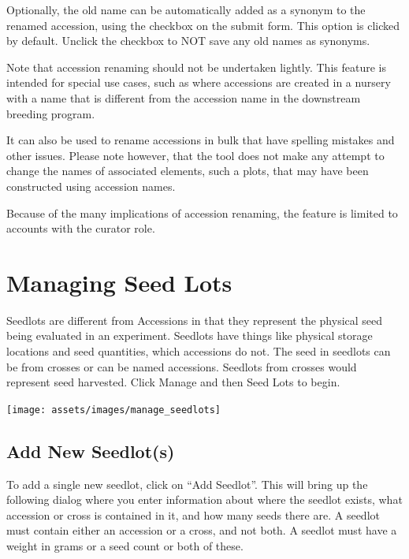 \documentclass[
  12pt,
]{book}
\begin{document}
Optionally, the old name can be automatically added as a synonym to the renamed accession, using the checkbox on the submit form. This option is clicked by default. Unclick the checkbox to NOT save any old names as synonyms.

Note that accession renaming should not be undertaken lightly. This feature is intended for special use cases, such as where accessions are created in a nursery with a name that is different from the accession name in the downstream breeding program.

It can also be used to rename accessions in bulk that have spelling mistakes and other issues. Please note however, that the tool does not make any attempt to change the names of associated elements, such a plots, that may have been constructed using accession names.

Because of the many implications of accession renaming, the feature is limited to accounts with the curator role.

\hypertarget{managing-seed-lots}{%
\chapter{Managing Seed Lots}\label{managing-seed-lots}}

Seedlots are different from Accessions in that they represent the physical seed being evaluated in an experiment. Seedlots have things like physical storage locations and seed quantities, which accessions do not. The seed in seedlots can be from crosses or can be named accessions. Seedlots from crosses would represent seed harvested. Click Manage and then Seed Lots to begin.

\begin{center}\texttt{[image: assets/images/manage\_seedlots]} \end{center}

\hypertarget{add-new-seedlots}{%
\section{Add New Seedlot(s)}\label{add-new-seedlots}}

To add a single new seedlot, click on ``Add Seedlot''. This will bring up the following dialog where you enter information about where the seedlot exists, what accession or cross is contained in it, and how many seeds there are. A seedlot must contain either an accession or a cross, and not both. A seedlot must have a weight in grams or a seed count or both of these.
\end{document}
